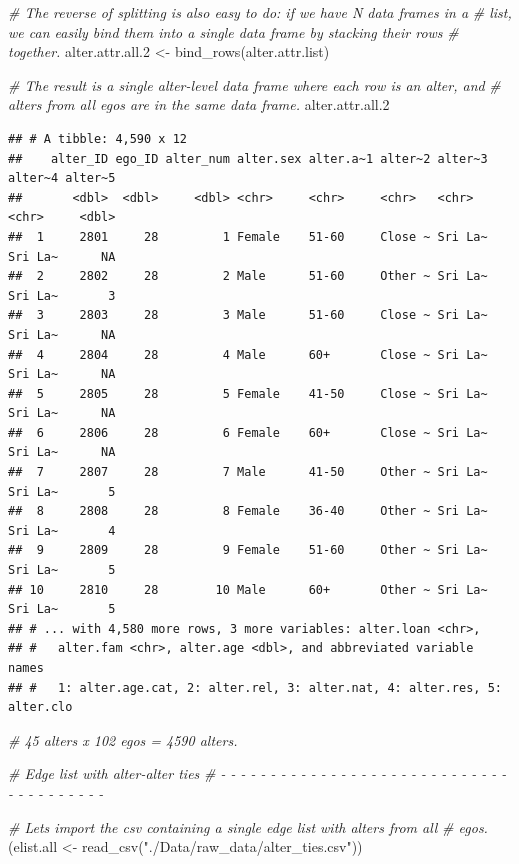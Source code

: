 \documentclass[
]{book}
\newenvironment{Shaded}{\begin{snugshade}}{\end{snugshade}}
\newcommand{\CommentTok}[1]{\textcolor[rgb]{0.56,0.35,0.01}{\textit{#1}}}
\newcommand{\FloatTok}[1]{\textcolor[rgb]{0.00,0.00,0.81}{#1}}
\newcommand{\FunctionTok}[1]{\textcolor[rgb]{0.00,0.00,0.00}{#1}}
\newcommand{\NormalTok}[1]{#1}
\newcommand{\OtherTok}[1]{\textcolor[rgb]{0.56,0.35,0.01}{#1}}
\newcommand{\StringTok}[1]{\textcolor[rgb]{0.31,0.60,0.02}{#1}}
\begin{document}
\begin{Shaded}
\begin{Highlighting}[]
\CommentTok{\# The reverse of splitting is also easy to do: if we have N data frames in a}
\CommentTok{\# list, we can easily bind them into a single data frame by stacking their rows}
\CommentTok{\# together.}
\NormalTok{alter.attr.all}\FloatTok{.2} \OtherTok{\textless{}{-}} \FunctionTok{bind\_rows}\NormalTok{(alter.attr.list)}

\CommentTok{\# The result is a single alter{-}level data frame where each row is an alter, and}
\CommentTok{\# alters from all egos are in the same data frame.}
\NormalTok{alter.attr.all}\FloatTok{.2}
\end{Highlighting}
\end{Shaded}

\begin{verbatim}
## # A tibble: 4,590 x 12
##    alter_ID ego_ID alter_num alter.sex alter.a~1 alter~2 alter~3 alter~4 alter~5
##       <dbl>  <dbl>     <dbl> <chr>     <chr>     <chr>   <chr>   <chr>     <dbl>
##  1     2801     28         1 Female    51-60     Close ~ Sri La~ Sri La~      NA
##  2     2802     28         2 Male      51-60     Other ~ Sri La~ Sri La~       3
##  3     2803     28         3 Male      51-60     Close ~ Sri La~ Sri La~      NA
##  4     2804     28         4 Male      60+       Close ~ Sri La~ Sri La~      NA
##  5     2805     28         5 Female    41-50     Close ~ Sri La~ Sri La~      NA
##  6     2806     28         6 Female    60+       Close ~ Sri La~ Sri La~      NA
##  7     2807     28         7 Male      41-50     Other ~ Sri La~ Sri La~       5
##  8     2808     28         8 Female    36-40     Other ~ Sri La~ Sri La~       4
##  9     2809     28         9 Female    51-60     Other ~ Sri La~ Sri La~       5
## 10     2810     28        10 Male      60+       Other ~ Sri La~ Sri La~       5
## # ... with 4,580 more rows, 3 more variables: alter.loan <chr>,
## #   alter.fam <chr>, alter.age <dbl>, and abbreviated variable names
## #   1: alter.age.cat, 2: alter.rel, 3: alter.nat, 4: alter.res, 5: alter.clo
\end{verbatim}

\begin{Shaded}
\begin{Highlighting}[]
\CommentTok{\# 45 alters x 102 egos = 4590 alters.}

\CommentTok{\# Edge list with alter{-}alter ties}
\CommentTok{\# {-} {-} {-} {-} {-} {-} {-} {-} {-} {-} {-} {-} {-} {-} {-} {-} {-} {-} {-} {-} {-} {-} {-} {-} {-} {-} {-} {-} {-} {-} {-} {-} {-} {-} {-} {-} {-} {-} {-} }

\CommentTok{\# Let\textquotesingle{}s import the csv containing a single edge list with alters from all}
\CommentTok{\# egos.}
\NormalTok{(elist.all }\OtherTok{\textless{}{-}} \FunctionTok{read\_csv}\NormalTok{(}\StringTok{"./Data/raw\_data/alter\_ties.csv"}\NormalTok{))}
\end{Highlighting}
\end{Shaded}
\end{document}
